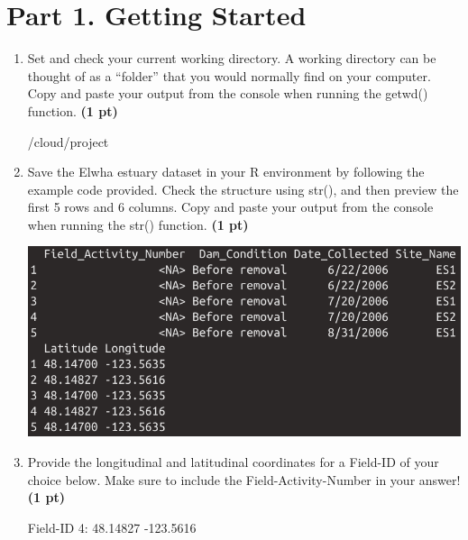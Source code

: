 \documentclass[12pt,letterpaper]{article}
\begin{document}
\section*{Part 1. Getting Started}
\begin{enumerate}[font=\bfseries, wide]
    \item Set and check your current working directory. A working directory can be thought of as a “folder” that you would normally find on your computer. Copy and paste your output from the console when running the getwd() function. \textbf{(1 pt)}\par 
    
    /cloud/project

    \item Save the Elwha estuary dataset in your R environment by following the example code provided. Check the structure using str(), and then preview the first 5 rows and 6 columns. Copy and paste your output from the console when running the str() function. \textbf{(1 pt)}
    \begin{center}
        \includegraphics[scale=0.35]{images/a2-qst2.png}
    \end{center}

    \item Provide the longitudinal and latitudinal coordinates for a Field-ID of your choice below. Make sure to include the Field-Activity-Number in your answer! \textbf{(1 pt)}\par

    Field-ID 4: 48.14827 -123.5616
\end{enumerate}
\end{document}
